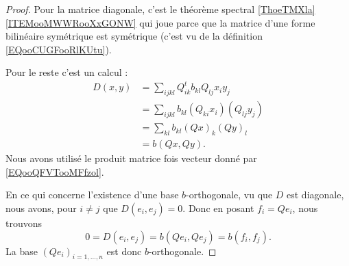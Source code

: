 \begin{proof}
	Pour la matrice diagonale, c'est le théorème spectral \ref{ThoeTMXla}\ref{ITEMooMWWRooXxGONW} qui joue parce que la matrice d'une forme bilinéaire symétrique est symétrique (c'est vu de la définition \eqref{EQooCUGFooRlKUtu}).

	Pour le reste c'est un calcul :
	\begin{subequations}
		\begin{align}
			D(x,y) & =\sum_{ijkl}Q^t_{ik}b_{kl}Q_{lj}x_iy_j   \\
			       & =\sum_{ijkl}b_{kl}(Q_{ki}x_i)(Q_{lj}y_j) \\
			       & =\sum_{kl}b_{kl}(Qx)_k(Qy)_l             \\
			       & =b(Qx,Qy).
		\end{align}
	\end{subequations}
	Nous avons utilisé le produit matrice fois vecteur donné par \eqref{EQooQFVTooMFfzol}.

	En ce qui concerne l'existence d'une base \( b\)-orthogonale, vu que \( D\) est diagonale, nous avons, pour \( i\neq j\) que \( D(e_i,e_j)=0\). Donc en posant \( f_i=Qe_i\), nous trouvons
	\begin{equation}
		0=D(e_i,e_j)=b(Qe_i,Qe_j)=b(f_i,f_j).
	\end{equation}
	La base \( (Qe_i)_{i=1,\ldots, n}\) est donc \( b\)-orthogonale.
\end{proof}
